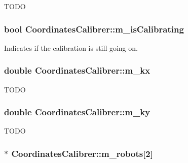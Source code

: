 \label{classCoordinatesCalibrer_a0fd71c87e90fc61802942e22c9584fb9}
TODO \hypertarget{classCoordinatesCalibrer_a2d3543afab02c87d0e06861d064bd265}{
\subsubsection[{m\_\-isCalibrating}]{\setlength{\rightskip}{0pt plus 5cm}bool {\bf CoordinatesCalibrer::m\_\-isCalibrating}}}
\label{classCoordinatesCalibrer_a2d3543afab02c87d0e06861d064bd265}
Indicates if the calibration is still going on. \hypertarget{classCoordinatesCalibrer_a337af708f5dc1bfca0d191b988d8ab49}{
\subsubsection[{m\_\-kx}]{\setlength{\rightskip}{0pt plus 5cm}double {\bf CoordinatesCalibrer::m\_\-kx}}}
\label{classCoordinatesCalibrer_a337af708f5dc1bfca0d191b988d8ab49}
TODO \hypertarget{classCoordinatesCalibrer_a10648b2ef70a9ad0fd874e04f3b4d488}{
\subsubsection[{m\_\-ky}]{\setlength{\rightskip}{0pt plus 5cm}double {\bf CoordinatesCalibrer::m\_\-ky}}}
\label{classCoordinatesCalibrer_a10648b2ef70a9ad0fd874e04f3b4d488}
TODO \hypertarget{classCoordinatesCalibrer_aebcdb5e598d2af268ab93a0271c245b6}{
\subsubsection[{m\_\-robots}]{$\ast$ {\bf CoordinatesCalibrer::m\_\-robots}\mbox{[}2\mbox{]}}}

